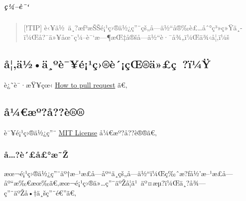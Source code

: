 \subparagraph{ç¼--è¯`}\label{uxe7uxbcuxe8-1}

\begin{Shaded}
\begin{Highlighting}[]
\end{Highlighting}
\end{Shaded}

\begin{quote}
{[}!TIP{]}
è‹¥ä½~ä¸?æƒ³æŠŠé¡¹ç›®ä½¿ç''¨çš„å­---ä½``å®‰è£\ldots åˆ°ç³»ç»Ÿä¸­ï¼Œå?¯ä»¥åœ¨ç¼--è¯`æ---¶æŒ‡å®šå­---ä½``è·¯å¾„ï¼Œä¾‹å¦‚ï¼š

\begin{Shaded}
\begin{Highlighting}[]
\end{Highlighting}
\end{Shaded}
\end{quote}

\subsection{å¦‚ä½•ä¸ºè¯¥é¡¹ç›®è´¡çŒ®ä»£ç~?ï¼Ÿ}\label{uxe5uxe4uxbduxe4uxbauxe8uxe9uxb9uxe7uxe8uxe7ux153uxe4uxe7-uxefuxbcuxff}

è¿˜è¯·æŸ¥çœ‹
\href{https://github.com/typst/packages/raw/main/packages/preview/paddling-tongji-thesis/0.1.1/CONTRIBUTING.md/\#how-to-pull-request}{How
to pull request} ã€‚

\subsection{å¼€æº?å??è®®}\label{uxe5uxbcuxe6uxbauxe5uxe8}

è¯¥é¡¹ç›®ä½¿ç''¨
\href{https://github.com/typst/packages/raw/main/packages/preview/paddling-tongji-thesis/0.1.1/LICENSE}{MIT
License} å¼€æº?å??è®®ã€‚

\subsubsection{å\ldots?è´£å£°æ˜Ž}\label{uxe5uxe8uxe5uxe6ux17e}

æœ¬é¡¹ç›®ä½¿ç''¨äº†æ--¹æ­£å­---åº``ä¸­çš„å­---ä½``ï¼Œç‰ˆæ?ƒå½'æ--¹æ­£å­---åº``æ‰€æœ‰ã€‚æœ¬é¡¹ç›®ä»\ldots ç''¨äºŽå­¦ä¹~äº¤æµ?ï¼Œä¸?å¾---ç''¨äºŽå•†ä¸šç''¨é€''ã€‚

